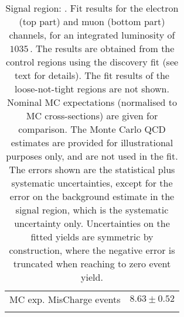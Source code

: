 \begin{table}
\begin{center}
{\begin{tabular*}{\textwidth}{@{\extracolsep{\fill}}lr}
        MC exp. MisCharge events         & $8.63 \pm 0.52$              \\
\noalign{\smallskip}\hline\noalign{\smallskip}
\end{tabular*}
}
\end{center}
\caption{Signal region: . Fit results for the electron (top part) and muon (bottom part) channels, for an integrated luminosity of $1035$\,\ipb.
The results are obtained from the control regions using the discovery fit (see text for details). The fit results of the loose-not-tight regions are not shown.
Nominal MC expectations (normalised to MC cross-sections) are given for comparison. 
The Monte Carlo QCD estimates are provided for illustrational purposes only, and are not used in the fit.
The errors shown are the statistical plus systematic uncertainties, except for the error on the background estimate in the signal region, which is the systematic uncertainty only.
Uncertainties on the fitted yields are symmetric by construction, 
where the negative error is truncated when reaching to zero event yield.
}
\label{table.results.systematics.in.logL.fit.table.results.yields}
\end{table}
%